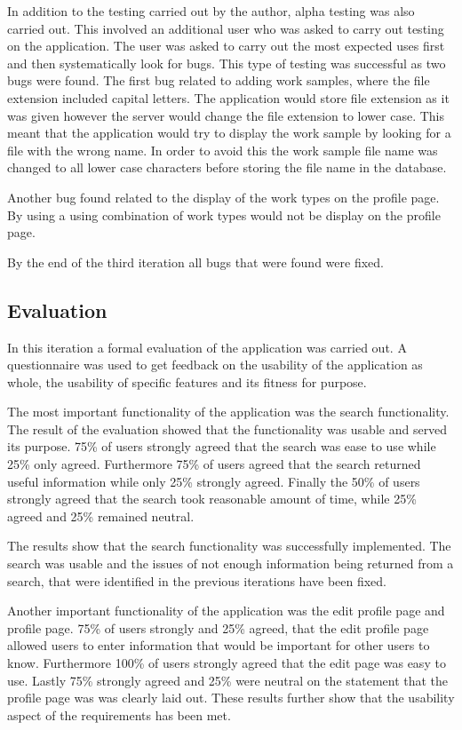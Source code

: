 \documentclass[a4paper,oneside,11pt]{report}
\begin{document}
In addition to the testing carried out by the author, alpha testing was also carried out. This involved an additional user who was asked to carry out testing on the application. The user was asked to carry out the most expected uses first and then systematically look for bugs. This type of testing was successful as two bugs were found. The first bug related to adding work samples, where the file extension included capital letters. The application would store file extension as it was given however the server would change the file extension to lower case. This meant that the application would try to display the work sample by looking for a file with the wrong name. In order to avoid this the work sample file name was changed to all lower case characters before storing the file name in the database.

Another bug found related to the display of the work types on the profile page. By using a using combination of work types would not be display on the profile page.

By the end of the third iteration all bugs that were found were fixed.

\pagebreak
\subsection{Evaluation}
In this iteration a formal evaluation of the application was carried out. A questionnaire was used to get feedback on the usability of the application as whole, the usability of specific features and its fitness for purpose.

The most important functionality of the application was the search functionality. The result of the evaluation showed that the functionality was usable and served its purpose. 75\% of users strongly agreed that the search was ease to use while 25\% only agreed. Furthermore 75\% of users agreed that the search returned useful information while only 25\% strongly agreed. Finally the 50\% of users strongly agreed that the search took reasonable amount of time, while 25\% agreed and 25\% remained neutral. 

The results show that the search functionality was successfully implemented. The search was usable and the issues of not enough information being returned from a search, that were identified in the previous iterations have been fixed.

Another important functionality of the application was the edit profile page and profile page. 75\% of users strongly and 25\% agreed, that the edit profile page allowed users to enter information that would be important for other users to know. Furthermore 100\% of users strongly agreed that the edit page was easy to use. Lastly 75\% strongly agreed and 25\% were neutral on the statement that the profile page was was clearly laid out. These results further show that the usability aspect of the requirements has been met.
\end{document}
